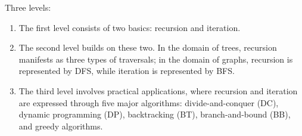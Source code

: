 \documentclass[a4paper,11pt,twoside]{book}
\begin{document}
	\par Three levels:
\begin{enumerate}
	\item The first level consists of two basics: recursion and iteration.

	\item The second level builds on these two. In the domain of trees, recursion manifests as three types of traversals; in the domain of graphs, recursion is represented by DFS, while iteration is represented by BFS.

	\item The third level involves practical applications, where recursion and iteration are expressed through five major algorithms: divide-and-conquer (DC), dynamic programming (DP), backtracking (BT), branch-and-bound (BB), and greedy algorithms.
\end{enumerate}
\end{document}
